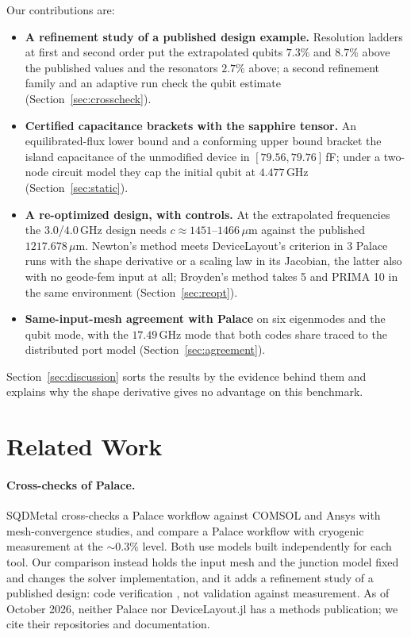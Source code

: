 \documentclass{anvil-paper}
\begin{document}
Our contributions are:
\begin{itemize}
  \item \textbf{A refinement study of a published design example.}
    Resolution ladders at first and second order put the extrapolated
    qubits $7.3\%$ and $8.7\%$ above the published values and the
    resonators $2.7\%$ above; a second refinement family and an adaptive
    run check the qubit estimate (Section~\ref{sec:crosscheck}).
  \item \textbf{Certified capacitance brackets with the sapphire tensor.}
    An equilibrated-flux lower bound and a conforming upper bound bracket
    the island capacitance of the unmodified device in $[79.56,
    79.76]$\,fF; under a two-node circuit model they cap the initial qubit
    at $4.477$\,GHz (Section~\ref{sec:static}).
  \item \textbf{A re-optimized design, with controls.} At the extrapolated
    frequencies the $3.0$/$4.0$\,GHz design needs $c \approx
    1451$--$1466\,\mu$m against the published $1217.678\,\mu$m. Newton's
    method meets DeviceLayout's criterion in 3 Palace runs with the shape
    derivative or a scaling law in its Jacobian, the latter also with no
    geode-fem input at all; Broyden's method takes 5 and PRIMA 10 in the
    same environment (Section~\ref{sec:reopt}).
  \item \textbf{Same-input-mesh agreement with Palace} on six eigenmodes
    and the qubit mode, with the $17.49$\,GHz mode that both codes share
    traced to the distributed port model (Section~\ref{sec:agreement}).
\end{itemize}

Section~\ref{sec:discussion} sorts the results by the evidence behind them
and explains why the shape derivative gives no advantage on this benchmark.

\section{Related Work}
\label{sec:related}

\paragraph{Cross-checks of Palace.}
SQDMetal \citep{sommers2025open} cross-checks a Palace workflow against
COMSOL and Ansys with mesh-convergence studies, and
\citet{ye2025electromagnetic} compare a Palace workflow with cryogenic
measurement at the ${\sim}0.3\%$ level. Both use models built
independently for each tool. Our comparison instead holds the input mesh
and the junction model fixed and changes the solver implementation, and it
adds a refinement study of a published design: code verification
\citep{oberkampf2010verification}, not validation against measurement. As of October 2026, neither Palace nor DeviceLayout.jl has a
methods publication; we cite their repositories and documentation.
\end{document}
